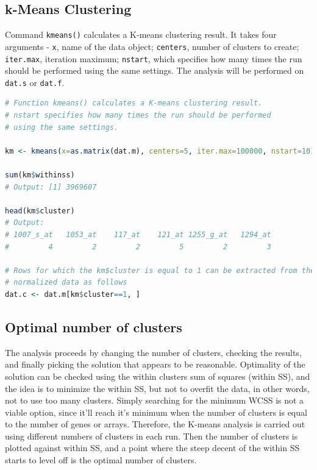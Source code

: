 \documentclass[oneside, a4paper, 11pt]{book}
\begin{document}
\subsection{k-Means Clustering}
Command \texttt{kmeans()} calculates a K-means clustering result. It takes four arguments - \texttt{x}, name of the data object; \texttt{centers}, number of clusters to create; \texttt{iter.max}, iteration maximum; \texttt{nstart}, which specifies how many times the run should be performed using the same settings. The analysis will be performed on \texttt{dat.s} or \texttt{dat.f}.

\begin{lstlisting}[language=R, caption=Performing k-means Clustering]
# Function kmeans() calculates a K-means clustering result.
# nstart specifies how many times the run should be performed
# using the same settings.

km <- kmeans(x=as.matrix(dat.m), centers=5, iter.max=100000, nstart=10)

sum(km$withinss)
# Output: [1] 3969607

head(km$cluster)
# Output:
# 1007_s_at   1053_at    117_at    121_at 1255_g_at   1294_at 
#         4         2         2         5         2         3

# Rows for which the km$cluster is equal to 1 can be extracted from the
# normalized data as follows
dat.c <- dat.m[km$cluster==1, ]
\end{lstlisting}

\subsection{Optimal number of clusters}
The analysis proceeds by changing the number of clusters, checking the results, and finally picking the solution that appears to be reasonable. Optimality of the solution can be checked using the within clusters sum of squares (within SS), and the idea is to minimize the within SS, but not to overfit the data, in other words, not to use too many clusters. Simply searching for the minimum WCSS is not a viable option, since it'll reach it’s minimum when the number of clusters is equal to the number of genes or arrays. Therefore, the K-means analysis is carried out using different numbers of clusters in each run. Then the number of clusters is plotted against within SS, and a point where the steep decent of the within SS starts to level off is the optimal number of clusters.
\end{document}
